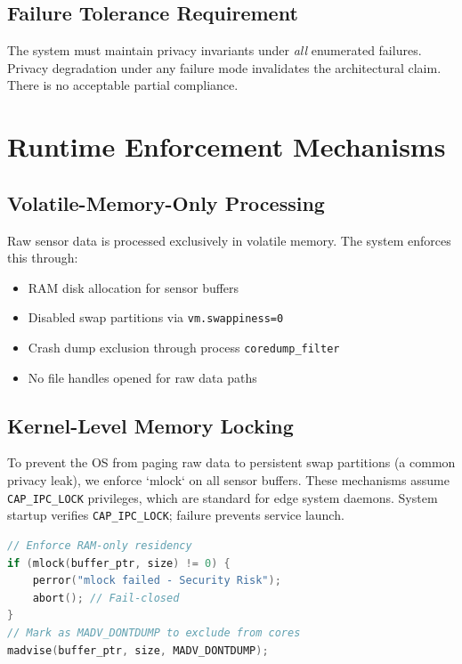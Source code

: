 \documentclass[conference]{IEEEtran}
\begin{document}
\subsection{Failure Tolerance Requirement}
The system must maintain privacy invariants under \textit{all} enumerated failures. Privacy degradation under any failure mode invalidates the architectural claim. There is no acceptable partial compliance.

\section{Runtime Enforcement Mechanisms}

\subsection{Volatile-Memory-Only Processing}
Raw sensor data is processed exclusively in volatile memory. The system enforces this through:
\begin{itemize}
    \item RAM disk allocation for sensor buffers
    \item Disabled swap partitions via \texttt{vm.swappiness=0}
    \item Crash dump exclusion through process \texttt{coredump\_filter}
    \item No file handles opened for raw data paths
\end{itemize}

\subsection{Kernel-Level Memory Locking}
To prevent the OS from paging raw data to persistent swap partitions (a common privacy leak), we enforce `mlock` on all sensor buffers. These mechanisms assume \texttt{CAP\_IPC\_LOCK} privileges, which are standard for edge system daemons. System startup verifies \texttt{CAP\_IPC\_LOCK}; failure prevents service launch.

\begin{lstlisting}[language=C, caption={Kernel Locking Strategy}]
// Enforce RAM-only residency
if (mlock(buffer_ptr, size) != 0) {
    perror("mlock failed - Security Risk");
    abort(); // Fail-closed
}
// Mark as MADV_DONTDUMP to exclude from cores
madvise(buffer_ptr, size, MADV_DONTDUMP);
\end{lstlisting}
\end{document}
